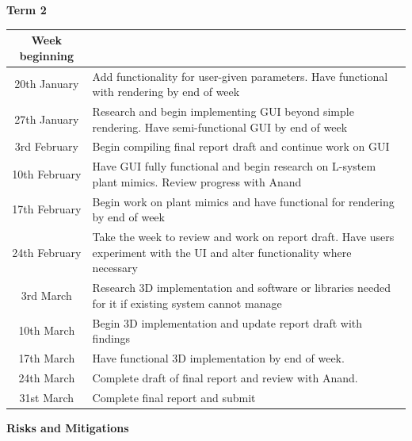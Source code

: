 \documentclass[]{plan}
\begin{document}
\textbf{\Large{Term 2}}
\renewcommand{\arraystretch}{1.5}

\begin{tabular}{c|p{12cm}}
    Week beginning\\
    \hline

    20th January & Add functionality for user-given parameters. Have functional with rendering by end of week\\
    27th January & Research and begin implementing GUI beyond simple rendering. Have semi-functional GUI by end of week\\
    3rd February & Begin compiling final report draft and continue work on GUI\\
    10th February & Have GUI fully functional and begin research on L-system plant mimics. Review progress with Anand\\
    17th February & Begin work on plant mimics and have functional for rendering by end of week\\
    24th February & Take the week to review and work on report draft. Have users experiment with the UI and alter functionality where necessary\\
    3rd March & Research 3D implementation and software or libraries needed for it if existing system cannot manage\\
    10th March & Begin 3D implementation and update report draft with findings\\
    17th March & Have functional 3D implementation by end of week.\\
    24th March & Complete draft of final report and review with Anand.\\
    31st March & Complete final report and submit\\
\end{tabular}

\newpage

{\textsf{\textbf{\LARGE{Risks and Mitigations}}}}
\end{document}
